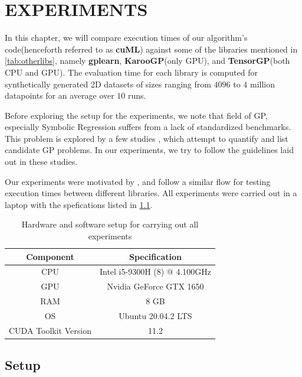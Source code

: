 \chapter{EXPERIMENTS}
\label{chap:experiments}

In this chapter, we will compare execution times of our algorithm's code(henceforth referred to as \textbf{cuML}) against some of the libraries mentioned in \cref{tab:otherlibs}, namely \textbf{gplearn}, \textbf{KarooGP}(only GPU), and \textbf{TensorGP}(both CPU and GPU). The evaluation time for each library is computed for synthetically generated 2D datasets of sizes ranging from $4096$ to $4$ million datapoints for an average over $10$ runs. 

Before exploring the setup for the experiments, we note that field of GP, especially Symbolic Regression suffers from a lack of standardized benchmarks. This problem is explored by a few studies \citep{GP_Better_Benchmarks}\citep{Orzechowski_2018}, which attempt to quantify and list candidate GP problems. In our experiments, we try to follow the guidelines laid out in these studies.

Our experiments were motivated by \citep{baeta2021speed}, and follow a similar flow for testing execution times between different libraries. All experiments were carried out in a laptop with the spefications listed in \cref*{tab:laptop}.

\begin{table}[htbp]
  \caption{Hardware and software setup for carrying out all experiments}
  \begin{center}
      \begin{tabular}[c]{cc}%
        \toprule
        \textbf{Component} &   \textbf{Specification} \\
        \midrule
        CPU & Intel i5-9300H (8) @ 4.100GHz \\
        GPU & Nvidia GeForce GTX 1650       \\
        RAM & 8 GB                          \\
        OS  & Ubuntu 20.04.2 LTS            \\
        CUDA Toolkit Version& 11.2          \\
        \bottomrule
      \end{tabular}
      \label{tab:laptop}
  \end{center}
\end{table}

\section{Setup}
\label{sec:setup}

